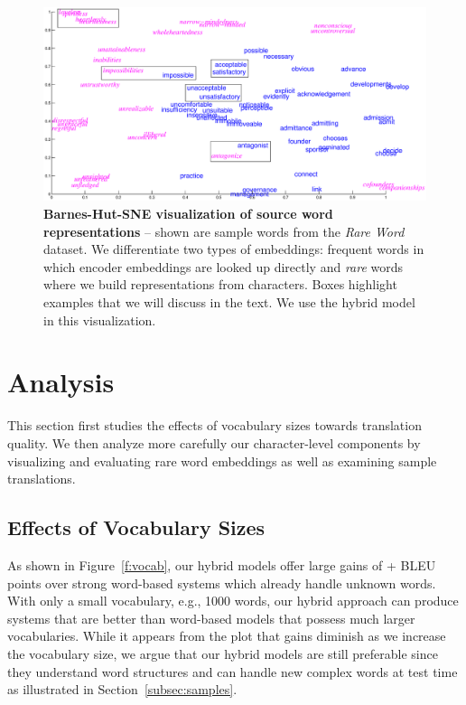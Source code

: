 \begin{figure}%
\centering
\includegraphics[width=\textwidth, clip=true, trim= 100 50 0 20]{img/5-emb}
\caption[Barnes-Hut-SNE visualization of source word representations]{{\bf Barnes-Hut-SNE visualization of source word representations} --
shown are sample words from the {\it Rare Word} dataset. We differentiate two types of
embeddings: {\color{blue} frequent} words in which encoder embeddings are looked up directly and {\it {\color{magenta} rare}} words
where we build representations from characters. Boxes highlight examples that
we will discuss in the text. We use the hybrid model \model{} in this visualization.}
\label{f:visual}
\end{figure}


\section{Analysis}
\label{sec:analysis}
This section first studies the effects of vocabulary sizes towards
translation quality. We then analyze more carefully 
our character-level components by visualizing and evaluating rare word
embeddings as well as examining sample translations.

\subsection{Effects of Vocabulary Sizes}
As shown in Figure~\ref{f:vocab}, our hybrid models offer large gains of
+\gain{} BLEU points over strong word-based systems which already handle unknown words.
With only a small vocabulary, e.g., 1000 words, our hybrid approach can produce
systems that are better than word-based models that possess much larger
vocabularies. While it appears from the plot that gains diminish as we
increase the vocabulary size, we argue that our hybrid models are still
preferable since they understand word structures and can handle new complex
words at test time as illustrated in Section~\ref{subsec:samples}.


